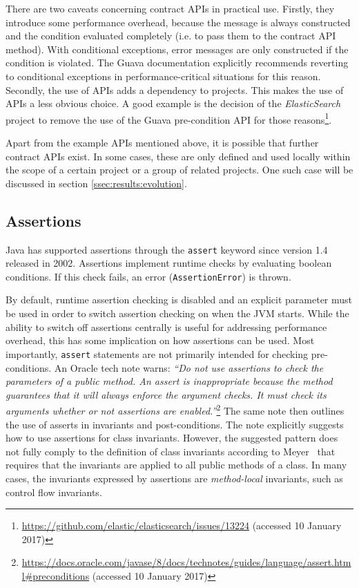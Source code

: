 \documentclass[a4paper,UKenglish]{lipics-v2016}
\begin{document}
There are two caveats concerning contract APIs in practical use. Firstly, they introduce some performance overhead, because the message is always constructed and the condition evaluated completely (i.e. to pass them to the contract API method).  With conditional exceptions, error messages are only constructed if the condition is violated.  The Guava documentation explicitly recommends reverting to conditional exceptions in performance-critical situations for this reason.   Secondly, the use of APIs adds a dependency to projects. This makes the use of APIs a less obvious choice. A good example is the decision of the \textit{ElasticSearch} project to remove the use of the Guava pre-condition API for those  reasons\footnote{\url{https://github.com/elastic/elasticsearch/issues/13224} (accessed 10 January 2017)}. 

Apart from the example APIs mentioned above, it is possible that further contract APIs exist. In some cases, these are only defined and used locally within the scope of a certain project or a group of related projects. One such case will be discussed in section \ref{ssec:results:evolution}.

\subsection{Assertions}
\label{ssect:assertions}

Java has supported  assertions  through the \texttt{assert} keyword since version 1.4 released in 2002. Assertions implement runtime checks by evaluating boolean conditions. If this check fails, an error (\texttt{AssertionError}) is thrown. 

By default, runtime assertion checking is disabled and an explicit parameter must be used in order to switch assertion checking on when the JVM starts. While the ability to switch off assertions centrally is useful for addressing performance overhead, this has some implication on how assertions can be used. Most importantly, \texttt{assert} statements are not primarily intended for checking pre-conditions.  An Oracle tech note warns: \textit{``Do not use assertions to check the parameters of a public method. An assert is inappropriate because the method guarantees that it will always enforce the argument checks. It must check its arguments whether or not assertions are enabled.''}\footnote{\url{https://docs.oracle.com/javase/8/docs/technotes/guides/language/assert.html\#preconditions}  (accessed 10 January 2017)} The same note then outlines the use of asserts in invariants and post-conditions. 
The note explicitly suggests how to use assertions for class invariants. However, the suggested pattern does not fully comply to the definition of class invariants according to Meyer~\cite{meyer1992applying} that requires that the invariants are applied to all public methods of a class. In many cases, the invariants expressed by assertions are \textit{method-local} invariants, such as control flow invariants.
\end{document}
